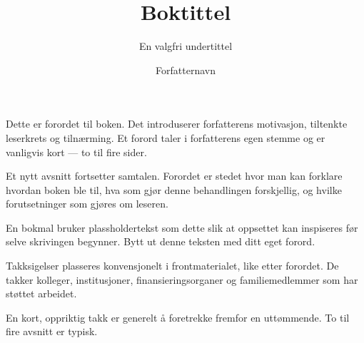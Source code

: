 \documentclass[12pt,twoside,b5paper]{book}
\begin{document}
\frontmatter
{}
\pagestyle{frontmatterstyle}


\title{Boktittel}
\subtitle{En valgfri undertittel}
\author{Forfatternavn}
\date{\the\year}


\booktitlepage





\booktoc
\cleardoublepage


Dette er forordet til boken. Det introduserer forfatterens motivasjon, tiltenkte leserkrets og tilnærming. Et forord taler i forfatterens egen stemme og er vanligvis kort --- to til fire sider.

Et nytt avsnitt fortsetter samtalen. Forordet er stedet hvor man kan forklare hvordan boken ble til, hva som gjør denne behandlingen forskjellig, og hvilke forutsetninger som gjøres om leseren.

En bokmal bruker plassholdertekst som dette slik at oppsettet kan inspiseres før selve skrivingen begynner. Bytt ut denne teksten med ditt eget forord.

\cleardoublepage


Takksigelser plasseres konvensjonelt i frontmaterialet, like etter forordet. De takker kolleger, institusjoner, finansieringsorganer og familiemedlemmer som har støttet arbeidet.

En kort, oppriktig takk er generelt å foretrekke fremfor en uttømmende. To til fire avsnitt er typisk.

\cleardoublepage


\mainmatter
\pagestyle{chapterstyle}
\end{document}
